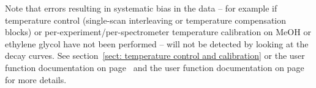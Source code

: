 Note that errors resulting in systematic bias in the data -- for example if temperature control (single-scan interleaving or temperature compensation blocks) or per-experiment/per-spectrometer temperature calibration on MeOH or ethylene glycol have not been performed -- will not be detected by looking at the decay curves.
See section~\ref{sect: temperature control and calibration} or the  user function documentation on page~\pageref{uf: relax_data.temp_calibration} and the  user function documentation on page~\pageref{uf: relax_data.temp_control} for more details.
